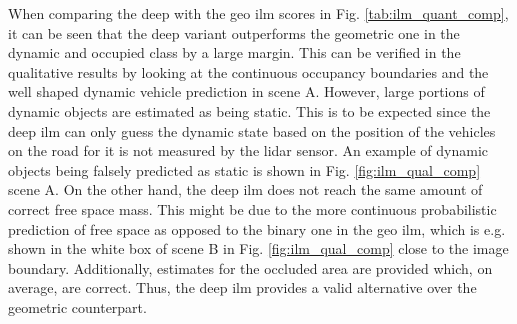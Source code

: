 When comparing the deep with the geo \gls{ilm} scores in Fig. \ref{tab:ilm_quant_comp}, it can be seen that the deep variant outperforms the geometric one in the dynamic and occupied class by a large margin. This can be verified in the qualitative results by looking at the continuous occupancy boundaries and the well shaped dynamic vehicle prediction in scene A. However, large portions of dynamic objects are estimated as being static. This is to be expected since the deep \gls{ilm} can only guess the dynamic state based on the position of the vehicles on the road for it is not measured by the lidar sensor. An example of dynamic objects being falsely predicted as static is shown in Fig. \ref{fig:ilm_qual_comp} scene A. On the other hand, the deep \gls{ilm} does not reach the same amount of correct free space mass. This might be due to the more continuous probabilistic prediction of free space as opposed to the binary one in the geo \gls{ilm}, which is e.g. shown in the white box of scene B in Fig. \ref{fig:ilm_qual_comp} close to the image boundary. Additionally, estimates for the occluded area are provided which, on average, are correct. Thus, the deep \gls{ilm} provides a valid alternative over the geometric counterpart.
